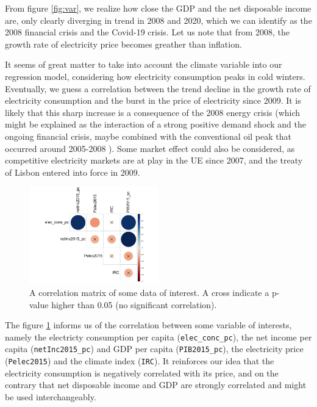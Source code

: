From figure \ref{fig:var}, we realize how close the GDP and the net disposable income are, only clearly diverging in trend in 2008 and 2020, which we can identify as the 2008 financial crisis and the Covid-19 crisis. Let us note that from 2008, the growth rate of electricity price becomes greather than inflation.

It seems of great matter to take into account the climate variable into our regression model, considering how electricity consumption peaks in cold winters. Eventually, we guess a correlation between the trend decline in the growth rate of electricity consumption and the burst in the price of electricity since 2009. It is likely that this sharp increase is a consequence of the 2008 energy crisis (which might be explained as the interaction of a strong positive demand shock and the ongoing financial crisis, maybe combined with the conventional oil peak that occurred around 2005-2008 \cite{delannoy2021peak}). Some market effect could also be considered, as competitive electricity markets are at play in the UE since 2007, and the treaty of Lisbon entered into force in 2009.

\begin{figure}[h]
    \centering
    \includegraphics[width=0.5\textwidth, trim={0 0 0 5pt}, clip]{Images/correlation_matrix.jpeg}
        \caption{A correlation matrix of some data of interest. A cross indicate a p-value higher than 0.05 (no significant correlation).}
    \label{corr_mat}
  \end{figure}

The figure \ref{corr_mat} informs us of the correlation between some variable of interests, namely the electricty consumption per capita (\texttt{elec\_conc\_pc}), the net income per capita (\texttt{netInc2015\_pc}) and GDP per capita (\texttt{PIB2015\_pc}), the electricity price (\texttt{Pelec2015}) and the climate index (\texttt{IRC}). It reinforces our idea that the electricity consumption is negatively correlated with its price, and on the contrary that net disposable income and GDP are strongly correlated and might be used interchangeably.

